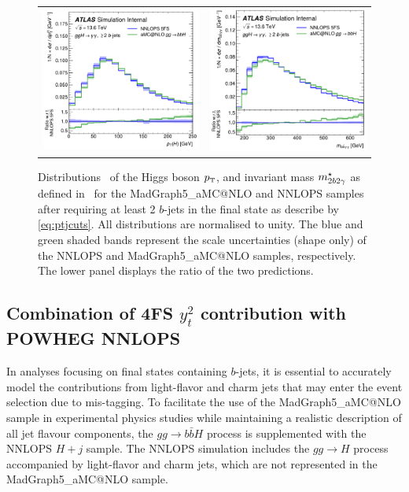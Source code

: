 \documentclass[11pt,a4paper]{article}
\begin{document}
\begin{figure}[t!]
\begin{center}
\begin{tabular}{cc}
\includegraphics[width=.45\textwidth, page=1]{plots/ATLAS/BJetCuts_Higgs1_Pt_shape_comparison_ratio.pdf}&
\includegraphics[width=.45\textwidth, page=1]{plots/ATLAS/BJetCuts_yybb_Mass_shape_comparison_ratio.pdf}
\end{tabular}
\vspace*{1ex}
\caption{Distributions~\cite{atlaspub} of the Higgs boson $\pt$, and invariant mass $m_{2b2\gamma}^{\star}$ as defined in~  for the {\sc MadGraph5\_aMC@NLO} and {\sc NNLOPS} samples after requiring at least 2 $b$-jets in the final state as describe by \eqref{eq:ptjcuts}. All distributions are normalised to unity. The blue and green shaded bands represent the scale uncertainties (shape only) of the {\sc NNLOPS} and {\sc MadGraph5\_aMC@NLO} samples, respectively. The lower panel displays the ratio of the two predictions.\label{fig:4fsNNLOPS}}
\end{center}
\end{figure}

\subsection{Combination of 4FS $y_t^2$ contribution with {\sc POWHEG NNLOPS}}

In analyses focusing on final states containing $b$-jets, it is essential to accurately model the contributions from light-flavor and charm jets that may enter the event selection due to mis-tagging. To facilitate the use of the {\sc MadGraph5\_aMC@NLO} sample in experimental physics studies while maintaining a realistic description of all jet flavour components, the $gg \to b\bar{b}H$ process is supplemented with the {\sc NNLOPS} $H + j$ sample. The {\sc NNLOPS} simulation includes the $gg \to H$ process accompanied by light-flavor and charm jets, which are not represented in the {\sc MadGraph5\_aMC@NLO} sample.
\end{document}
